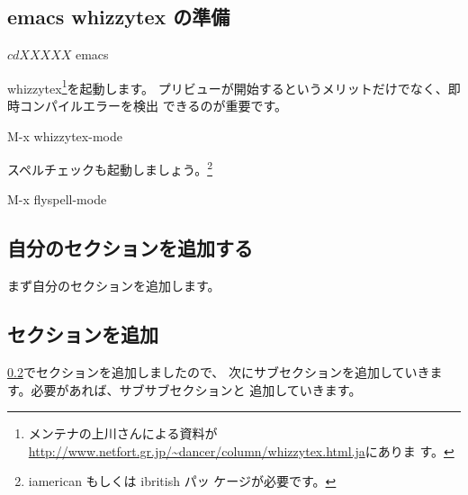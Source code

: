 \documentclass[mingoth,a4paper]{jsarticle}
\begin{document}

\subsection{emacs whizzytex の準備}

\begin{commandline}
$ cd XXXXX
$ emacs 
\end{commandline}

whizzytex\footnote{メンテナの上川さんによる資料が
\url{http://www.netfort.gr.jp/~dancer/column/whizzytex.html.ja}にありま
す。}を起動します。
プリビューが開始するというメリットだけでなく、即時コンパイルエラーを検出
できるのが重要です。

\begin{commandline}
M-x whizzytex-mode 
\end{commandline}

スペルチェックも起動しましょう。\footnote{iamerican もしくは ibritish パッ
ケージが必要です。}

\begin{commandline}
M-x flyspell-mode
\end{commandline}

\subsection{自分のセクションを追加する}
\label{sec:adddancersection}

まず自分のセクションを追加します。

\begin{commandline}
\label{XXXX@YYYY}


\end{commandline}

\newpage

\subsection{セクションを追加}

\ref{sec:adddancersection}でセクションを追加しましたので、
次にサブセクションを追加していきます。必要があれば、サブサブセクションと
追加していきます。
\end{document}
